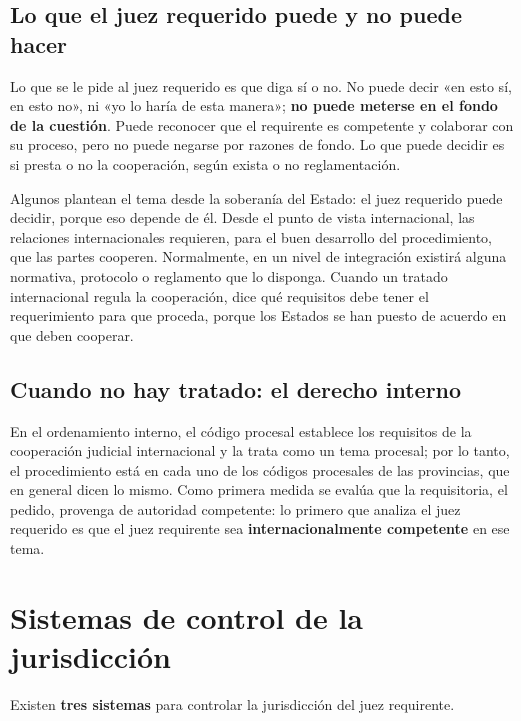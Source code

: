 \documentclass[12pt,oneside]{book}
\begin{document}
\subsection{Lo que el juez requerido puede y no puede hacer}

Lo que se le pide al juez requerido es que diga sí o no. No puede decir «en esto sí, en esto no», ni «yo lo haría de esta manera»; \textbf{no puede meterse en el fondo de la cuestión}. Puede reconocer que el requirente es competente y colaborar con su proceso, pero no puede negarse por razones de fondo. Lo que puede decidir es si presta o no la cooperación, según exista o no reglamentación.


Algunos plantean el tema desde la soberanía del Estado: el juez requerido puede decidir, porque eso depende de él. Desde el punto de vista internacional, las relaciones internacionales requieren, para el buen desarrollo del procedimiento, que las partes cooperen. Normalmente, en un nivel de integración existirá alguna normativa, protocolo o reglamento que lo disponga. Cuando un tratado internacional regula la cooperación, dice qué requisitos debe tener el requerimiento para que proceda, porque los Estados se han puesto de acuerdo en que deben cooperar.

\subsection{Cuando no hay tratado: el derecho interno}

En el ordenamiento interno, el código procesal establece los requisitos de la cooperación judicial internacional y la trata como un tema procesal; por lo tanto, el procedimiento está en cada uno de los códigos procesales de las provincias, que en general dicen lo mismo. Como primera medida se evalúa que la requisitoria, el pedido, provenga de autoridad competente: lo primero que analiza el juez requerido es que el juez requirente sea \textbf{internacionalmente competente} en ese tema.

\section{Sistemas de control de la jurisdicción}

Existen \textbf{tres sistemas} para controlar la jurisdicción del juez requirente.
\end{document}
